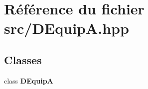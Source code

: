 \section{Référence du fichier src/\-D\-Equip\-A.hpp}
\label{_d_equip_a_8hpp}
\subsection*{Classes}
\begin{DoxyCompactItemize}
\item 
class {\bf D\-Equip\-A}
\end{DoxyCompactItemize}
